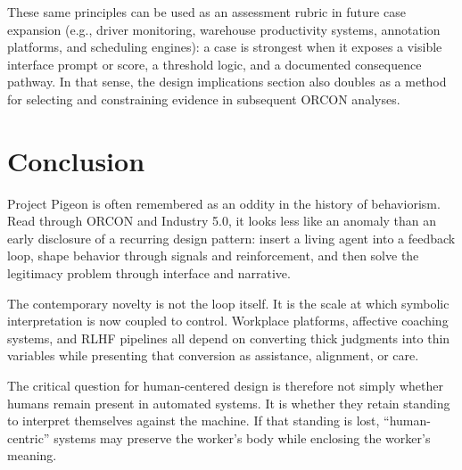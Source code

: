 \documentclass[runningheads]{llncs}
\begin{document}
These same principles can be used as an assessment rubric in future case expansion (e.g., driver monitoring, warehouse productivity systems, annotation platforms, and scheduling engines): a case is strongest when it exposes a visible interface prompt or score, a threshold logic, and a documented consequence pathway. In that sense, the design implications section also doubles as a method for selecting and constraining evidence in subsequent ORCON analyses.

\section{Conclusion}

Project Pigeon is often remembered as an oddity in the history of behaviorism. Read through ORCON and Industry 5.0, it looks less like an anomaly than an early disclosure of a recurring design pattern: insert a living agent into a feedback loop, shape behavior through signals and reinforcement, and then solve the legitimacy problem through interface and narrative.

The contemporary novelty is not the loop itself. It is the scale at which symbolic interpretation is now coupled to control. Workplace platforms, affective coaching systems, and RLHF pipelines all depend on converting thick judgments into thin variables while presenting that conversion as assistance, alignment, or care.

The critical question for human-centered design is therefore not simply whether humans remain present in automated systems. It is whether they retain standing to interpret themselves against the machine. If that standing is lost, ``human-centric'' systems may preserve the worker's body while enclosing the worker's meaning.
\end{document}
